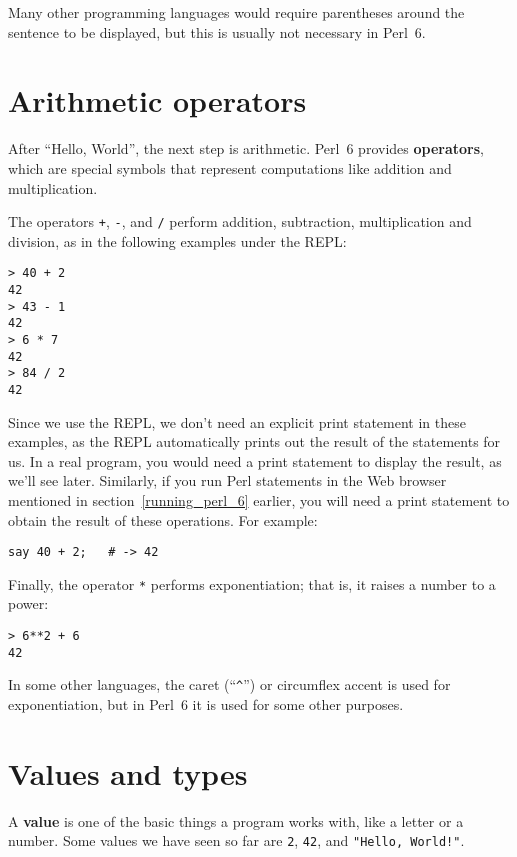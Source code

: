 Many other programming languages would require parentheses 
around the sentence to be displayed, but this is usually 
not necessary in Perl~6.

\section{Arithmetic operators}

After ``Hello, World'', the next step is arithmetic.  Perl~6 provides
{\bf operators}, which are special symbols that represent computations
like addition and multiplication.  

The operators {\tt +}, {\tt -}, {\tt *} and {\tt /} perform addition,
subtraction, multiplication and division, as in the following examples
under the REPL:

\begin{verbatim}
> 40 + 2
42
> 43 - 1
42
> 6 * 7
42
> 84 / 2
42
\end{verbatim}
%

Since we use the REPL, we don't need an explicit print 
statement in these examples, as the REPL automatically 
prints out the result of the statements for us. In a real 
program, you would need a print statement to display 
the result, as we'll see later. Similarly, if you run 
Perl statements in the Web browser mentioned in 
section~\ref{running_perl_6} earlier, you will need a 
print statement to obtain the result of these operations. 
For example:

\begin{verbatim}
say 40 + 2;   # -> 42
\end{verbatim}


Finally, the operator {\tt **} performs exponentiation; that is,
it raises a number to a power:

\begin{verbatim}
> 6**2 + 6
42
\end{verbatim}
%
In some other languages, the caret (``\verb"^"'') or 
circumflex accent is used for exponentiation, but in 
Perl~6 it is used for some other purposes.
%


\section{Values and types}

A {\bf value} is one of the basic things a program works with, like a
letter or a number.  Some values we have seen so far are {\tt 2},
{\tt 42}, and \verb'"Hello, World!"'.


